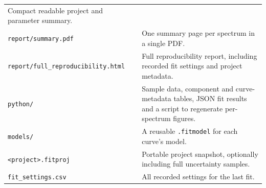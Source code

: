 \documentclass[
  10pt,
  a4paper,
  oneside]{scrreprt}
\begin{document}
\begin{longtable}[]{@{}ll@{}}
\begin{minipage}[t]{0.47\columnwidth}
Compact readable project and parameter summary.\strut
\end{minipage}\tabularnewline
\begin{minipage}[t]{0.47\columnwidth}\raggedright
\texttt{report/summary.pdf}\strut
\end{minipage} & \begin{minipage}[t]{0.47\columnwidth}\raggedright
One summary page per spectrum in a single PDF.\strut
\end{minipage}\tabularnewline
\begin{minipage}[t]{0.47\columnwidth}\raggedright
\texttt{report/full\_reproducibility.html}\strut
\end{minipage} & \begin{minipage}[t]{0.47\columnwidth}\raggedright
Full reproducibility report, including recorded fit settings and project
metadata.\strut
\end{minipage}\tabularnewline
\begin{minipage}[t]{0.47\columnwidth}\raggedright
\texttt{python/}\strut
\end{minipage} & \begin{minipage}[t]{0.47\columnwidth}\raggedright
Sample data, component and curve-metadata tables, JSON fit results and a
script to regenerate per-spectrum figures.\strut
\end{minipage}\tabularnewline
\begin{minipage}[t]{0.47\columnwidth}\raggedright
\texttt{models/}\strut
\end{minipage} & \begin{minipage}[t]{0.47\columnwidth}\raggedright
A reusable \texttt{.fitmodel} for each curve's model.\strut
\end{minipage}\tabularnewline
\begin{minipage}[t]{0.47\columnwidth}\raggedright
\texttt{\textless{}project\textgreater{}.fitproj}\strut
\end{minipage} & \begin{minipage}[t]{0.47\columnwidth}\raggedright
Portable project snapshot, optionally including full uncertainty
samples.\strut
\end{minipage}\tabularnewline
\begin{minipage}[t]{0.47\columnwidth}\raggedright
\texttt{fit\_settings.csv}\strut
\end{minipage} & \begin{minipage}[t]{0.47\columnwidth}\raggedright
All recorded settings for the last fit.\strut
\end{minipage}\tabularnewline

\end{longtable}
\end{document}
